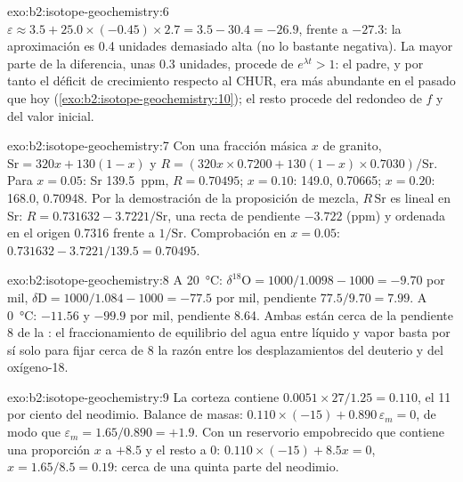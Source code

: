 \begin{solution}{exo:b2:isotope-geochemistry:6}
$\varepsilon \approx 3.5 + 25.0\times(-0.45)\times2.7 = 3.5 - 30.4 = -26.9$, frente a
$-27.3$: la aproximación es 0.4 unidades demasiado alta (no lo bastante negativa). La mayor parte de la
diferencia, unas 0.3 unidades, procede de $e^{\lambda t} > 1$: el padre, y por tanto el
déficit de crecimiento respecto al CHUR, era más abundante en el pasado que hoy
(\cref{exo:b2:isotope-geochemistry:10}); el resto procede del redondeo de $f$ y del valor inicial.
\end{solution}

\begin{solution}{exo:b2:isotope-geochemistry:7}
Con una fracción másica $x$ de granito, $\mathrm{Sr} = 320x + 130(1-x)$ y
$R = (320x\times0.7200 + 130(1-x)\times0.7030)/\mathrm{Sr}$. Para $x = 0.05$: Sr
\qty{139.5}{ppm}, $R = 0.70495$; $x = 0.10$: 149.0, 0.70665; $x = 0.20$: 168.0,
0.70948. Por la demostración de la proposición de mezcla, $R\,\mathrm{Sr}$ es lineal en Sr:
$R = 0.731632 - 3.7221/\mathrm{Sr}$, una recta de pendiente $-3.722$ (ppm) y
ordenada en el origen 0.7316 frente a $1/\mathrm{Sr}$. Comprobación en $x = 0.05$: $0.731632 - 3.7221/139.5
= 0.70495$.
\end{solution}

\begin{solution}{exo:b2:isotope-geochemistry:8}
A \qty{20}{\degreeCelsius}: $\delta^{18}\mathrm{O} = 1000/1.0098 - 1000 = -9.70$ por
mil, $\delta\mathrm{D} = 1000/1.084 - 1000 = -77.5$ por mil, pendiente $77.5/9.70 = 7.99$.
A \qty{0}{\degreeCelsius}: $-11.56$ y $-99.9$ por mil, pendiente 8.64. Ambas están cerca de
la pendiente 8 de la : el fraccionamiento de equilibrio del agua
entre líquido y vapor basta por sí solo para fijar cerca de 8 la razón entre los desplazamientos del deuterio y del
oxígeno-18.
\end{solution}

\begin{solution}{exo:b2:isotope-geochemistry:9}
La corteza contiene $0.0051\times27/1.25 = 0.110$, el 11 por ciento del neodimio. Balance de
masas: $0.110\times(-15) + 0.890\,\varepsilon_m = 0$, de modo que $\varepsilon_m = 1.65/0.890 =
+1.9$. Con un reservorio empobrecido que contiene una proporción $x$ a $+8.5$ y el resto a 0:
$0.110\times(-15) + 8.5x = 0$, $x = 1.65/8.5 = 0.19$: cerca de una quinta parte del
neodimio.
\end{solution}

